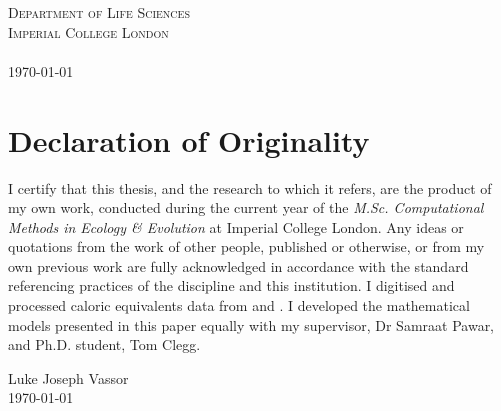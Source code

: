 \documentclass[a4paper]{article} %
\begin{document}
\begin{titlepage}
    \textsc{Department of Life Sciences \\ Imperial College London \\ \ }\\[1cm]
    \textsc{\today}\\ %
    
    \vfill %
    
\end{titlepage}

\section*{Declaration of Originality}\thispagestyle{plain}
    I certify that this thesis, and the research to which it refers, are the product of my own work, conducted during the current year of the \emph{M.Sc. Computational Methods in Ecology \& Evolution} at Imperial College London. Any ideas or quotations from the work of other people, published or otherwise, or from my own previous work are fully acknowledged in accordance with the standard referencing practices of the discipline and this institution. I digitised and processed caloric equivalents data from \textcite{Cummins1971} and \textcite{Steimle1980}. I developed the mathematical models presented in this paper equally with my supervisor, Dr Samraat Pawar, and Ph.D. student, Tom Clegg.

    \vspace{3cm}
    \begin{flushright}
        Luke Joseph Vassor \\
        \today
    \end{flushright}

\end{document}
